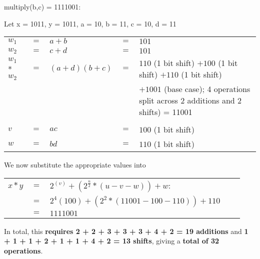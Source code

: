 \documentclass{article}
\begin{document}
multiply(b,c) = 1111001: \\
\begin{center}
	Let x = 1011, y = 1011, a = 10, b = 11, c = 10, d = 11 
	\begin{tabular}{l l l l l}
		\\$w_1$ 		  &$=$ &$a + b$      &$=$ &$101$\\
		$w_2$ 		      &$=$ &$c + d$      &$=$ &$101$\\
		$w_1$ * $w_2$     &$=$ &$(a+d)(b+c)$ &$=$ &$110$ (1 bit shift) $+ 100$ (1 bit shift) $+ 110$ (1 bit shift) \\
						  				  &&&&$+ 1001$ (base case); 4 operations split across 2 additions and 2 shifts) = 11001\\ \\
		$v$ 		      &$=$ &$ac$ 		 &$=$ &$100$ (1 bit shift)\\
		$w$ 		      &$=$ &$bd$ 		 &$=$ &$110$ (1 bit shift)\\
	\end{tabular}
\end{center}
We now substitute the appropriate values into 
\begin{center}
	\begin{tabular}{l l l l l}
		$x*y$ &$=$ &$2^(v) + (2^{\frac{n}{2}}* (u-v-w)) + w$: \\
			 &$=$ &$2^4(100) + (2^2 * (11001 - 100 - 110)) + 110$ \\
			 &$=$ &$1111001$ \\ 
	\end{tabular}
\end{center}

In total, this \textbf{requires 2 + 2 + 3 + 3 + 3 + 4 + 2 = 19 additions} and \textbf{1 + 1 + 1 + 2 + 1 + 1 + 4 + 2 = 13 shifts}, giving a \textbf{total of 32 operations}.\\
\end{document}

